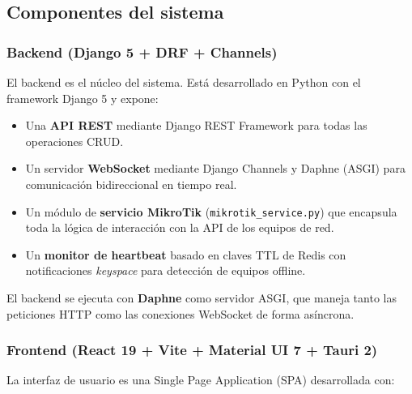 \documentclass[12pt, a4paper, twoside]{article}
\begin{document}
\subsection{Componentes del sistema}

\subsubsection{Backend (Django 5 + DRF + Channels)}

El backend es el núcleo del sistema. Está desarrollado en Python con el framework Django 5 y expone:

\begin{itemize}
  \item Una \textbf{API REST} mediante Django REST Framework para todas las operaciones CRUD.
  \item Un servidor \textbf{WebSocket} mediante Django Channels y Daphne (ASGI) para comunicación bidireccional en tiempo real.
  \item Un módulo de \textbf{servicio MikroTik} (\texttt{mikrotik\_service.py}) que encapsula toda la lógica de interacción con la API de los equipos de red.
  \item Un \textbf{monitor de heartbeat} basado en claves TTL de Redis con notificaciones \textit{keyspace} para detección de equipos offline.
\end{itemize}

El backend se ejecuta con \textbf{Daphne} como servidor ASGI, que maneja tanto las peticiones HTTP como las conexiones WebSocket de forma asíncrona.

\subsubsection{Frontend (React 19 + Vite + Material UI 7 + Tauri 2)}

La interfaz de usuario es una Single Page Application (SPA) desarrollada con:
\end{document}
